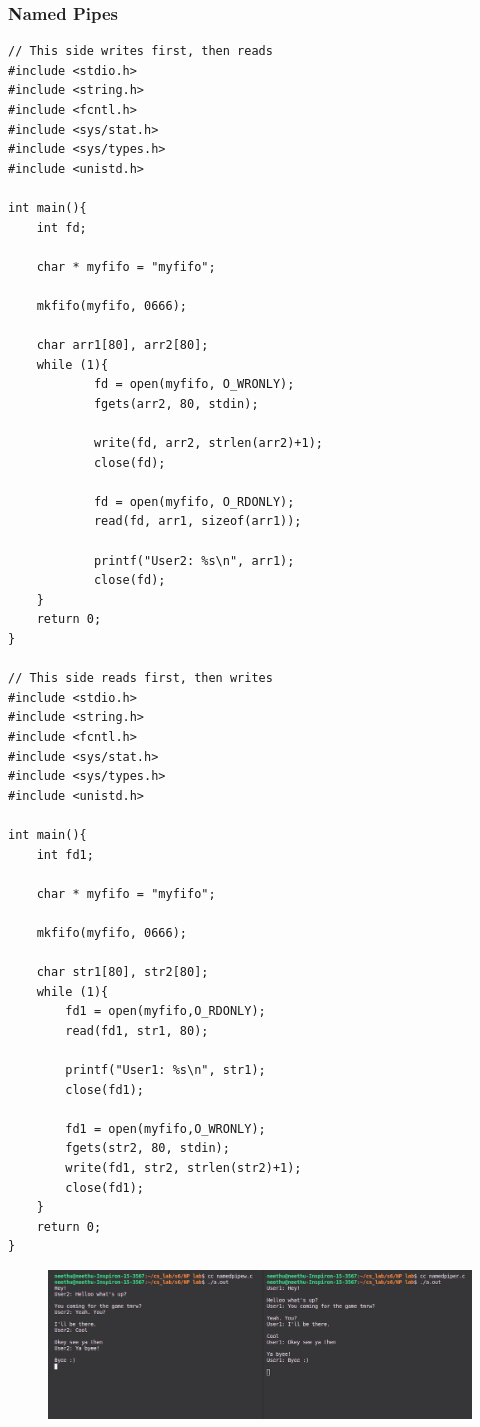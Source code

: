 \subsubsection{Named Pipes}
\begin{verbatim}
// This side writes first, then reads
#include <stdio.h>
#include <string.h>
#include <fcntl.h>
#include <sys/stat.h>
#include <sys/types.h>
#include <unistd.h>

int main(){
    int fd;
    
    char * myfifo = "myfifo";
    
    mkfifo(myfifo, 0666);
    
    char arr1[80], arr2[80];
    while (1){
        	fd = open(myfifo, O_WRONLY);
        	fgets(arr2, 80, stdin);
        
        	write(fd, arr2, strlen(arr2)+1);
        	close(fd);
        
        	fd = open(myfifo, O_RDONLY);
        	read(fd, arr1, sizeof(arr1));
        
        	printf("User2: %s\n", arr1);
        	close(fd);
    }
    return 0;
}

// This side reads first, then writes
#include <stdio.h>
#include <string.h>
#include <fcntl.h>
#include <sys/stat.h>
#include <sys/types.h>
#include <unistd.h>

int main(){
    int fd1;
    
    char * myfifo = "myfifo";
    
    mkfifo(myfifo, 0666);
    
    char str1[80], str2[80];
    while (1){
        fd1 = open(myfifo,O_RDONLY);
        read(fd1, str1, 80);
        
        printf("User1: %s\n", str1);
        close(fd1);
        
        fd1 = open(myfifo,O_WRONLY);
        fgets(str2, 80, stdin);
        write(fd1, str2, strlen(str2)+1);
        close(fd1);
    }
    return 0;
}
\end{verbatim}
\begin{figure}[h]
            \centering
            \includegraphics[scale=0.44]{img/e42.png}
\end{figure}

